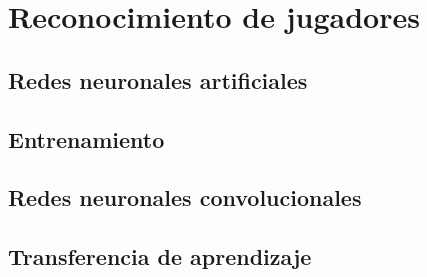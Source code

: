 \chapter{Reconocimiento de jugadores}
\section{Redes neuronales artificiales}
\section{Entrenamiento}
\section{Redes neuronales convolucionales}
\section{Transferencia de aprendizaje}
